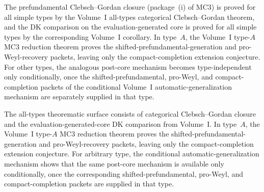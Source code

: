 \begin{remark}
The prefundamental Clebsch--Gordan closure
\textup{(}package~\textup{(i)} of MC3\textup{)} is proved for all simple
types by the Volume~I all-types categorical Clebsch--Gordan theorem,
and the DK comparison on the evaluation-generated core is proved for
all simple types by the corresponding Volume~I corollary. In type~$A$,
the Volume~I type-$A$ MC3 reduction theorem proves the
shifted-prefundamental-generation and pro-Weyl-recovery packets,
leaving only the compact-completion extension conjecture. For other
types, the analogous post-core mechanism becomes type-independent only
conditionally, once the shifted-prefundamental, pro-Weyl, and
compact-completion packets of
the conditional Volume~I automatic-generalization mechanism are separately
supplied in that type.
\end{remark}

\begin{construction}
The all-types theorematic surface consists of categorical
Clebsch--Gordan closure and the evaluation-generated-core DK
comparison from Volume~I. In type~$A$, the Volume~I type-$A$ MC3 reduction theorem
proves the shifted-prefundamental-generation and pro-Weyl-recovery
packets, leaving only the compact-completion extension conjecture.
For arbitrary type, the conditional automatic-generalization mechanism
shows that the same post-core mechanism is available only
conditionally, once the corresponding shifted-prefundamental,
pro-Weyl, and compact-completion packets are supplied in that type.
\end{construction}

